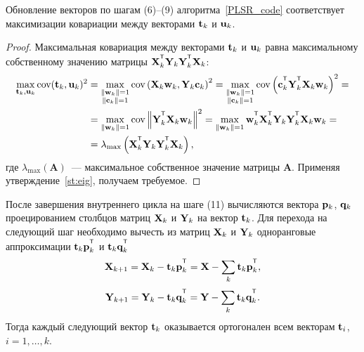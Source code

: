 \begin{statement}
	Обновление векторов по шагам (6)--(9) алгоритма~\ref{PLSR_code} соответствует максимизации ковариации между векторами $\mathbf{t}_k$ и $\mathbf{u}_k$.
\end{statement}
\begin{proof}
Максимальная ковариация между векторами $\mathbf{t}_k$ и $\mathbf{u}_k$ равна максимальному собственному значению матрицы $\bX_k^{\T} \bY_k \bY_k^{\T} \bX_k$:
\begin{align*}
\max_{\bt_k, \bu_k}  \text{cov} (\bt_k, \bu_k)^2 &= \max_{\substack{\|\bw_k\|=1 \\ \|\bc_k\| = 1}} \text{cov} \left( \bX_k \bw_k, \bY_k \bc_k \right)^2 = \max_{\substack{\|\bw_k\|=1 \\ \|\bc_k\| = 1}} \text{cov} \left(\bc_k^{\T}  \bY_k^{\T} \bX_k \bw_k \right)^2 = \\
&= \max_{\|\bw_k\| = 1} \text{cov} \left\|\bY_k^{\T} \bX_k \bw_k \right\|^2 = \max_{\|\bw_k\| = 1} \bw_k^{\T} \bX_k^{\T} \bY_k \bY_k^{\T} \bX_k \bw_k = \\
& = \lambda_{\max} \left( \bX_k^{\T} \bY_k \bY_k^{\T} \bX_k \right),
\end{align*}
где $ \lambda_{\max} (\mathbf{A})$~--- максимальное собственное значение матрицы $\mathbf{A}$.
Применяя утверждение~\ref{st:eig}, получаем требуемое.
\end{proof}

После завершения внутреннего цикла на шаге (11) вычисляются вектора $\mathbf{p}_k$, $\mathbf{q}_k$ проецированием столбцов матриц $\mathbf{X}_k$ и $\mathbf{Y}_k$ на вектор $\mathbf{t}_k$. Для перехода на следующий шаг необходимо вычесть из матриц $\mathbf{X}_k$ и $\mathbf{Y}_k$ одноранговые аппроксимации $\bt_k \bp_k^{\T}$ и $\bt_k \bq_k^{\T}$
\begin{equation*}
\bX_{k + 1} = \bX_{k} - \bt_k \bp_k^{\T} = \bX - \sum_k \bt_k \bp_k^{\T},
\end{equation*}
\begin{equation*}
\bY_{k + 1} = \bY_{k} - \bt_k \bq_k^{\T} = \bY - \sum_k \bt_k \bq_k^{\T}.
\end{equation*}
Тогда каждый следующий вектор $\mathbf{t}_k$ оказывается ортогонален всем векторам $\mathbf{t}_i$, $i=1, \dots, k$.

